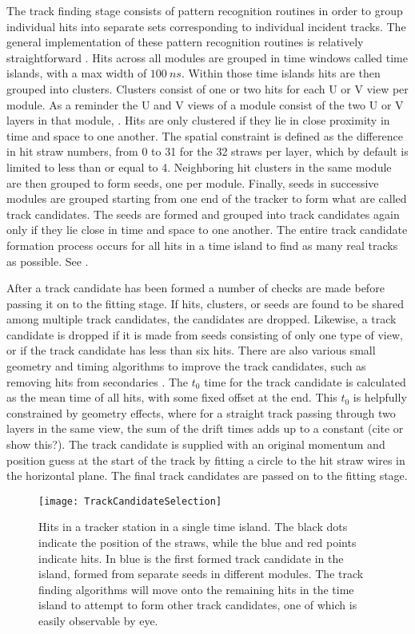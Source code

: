The track finding stage consists of pattern recognition routines in order to group individual hits into separate sets corresponding to individual incident tracks. The general implementation of these pattern recognition routines is relatively straightforward \cite{trackfinding,trackfinding2}. Hits across all modules are grouped in time windows called time islands, with a max width of $\SI{100}{ns}$. Within those time islands hits are then grouped into clusters. Clusters consist of one or two hits for each U or V view per module. As a reminder the U and V views of a module consist of the two U or V layers in that module, . Hits are only clustered if they lie in close proximity in time and space to one another. The spatial constraint is defined as the difference in hit straw numbers, from 0 to 31 for the 32 straws per layer, which by default is limited to less than or equal to 4. Neighboring hit clusters in the same module are then grouped to form seeds, one per module. Finally, seeds in successive modules are grouped starting from one end of the tracker to form what are called track candidates. The seeds are formed and grouped into track candidates again only if they lie close in time and space to one another. The entire track candidate formation process occurs for all hits in a time island to find as many real tracks as possible. See .

After a track candidate has been formed a number of checks are made before passing it on to the fitting stage. If hits, clusters, or seeds are found to be shared among multiple track candidates, the candidates are dropped. Likewise, a track candidate is dropped if it is made from seeds consisting of only one type of view, or if the track candidate has less than six hits. There are also various small geometry and timing algorithms to improve the track candidates, such as removing hits from secondaries \cite{trackfinding3}. The $t_{0}$ time for the track candidate is calculated as the mean time of all hits, with some fixed offset at the end. This $t_{0}$ is helpfully constrained by geometry effects, where for a straight track passing through two layers in the same view, the sum of the drift times adds up to a constant (cite or show this?). The track candidate is supplied with an original momentum and position guess at the start of the track by fitting a circle to the hit straw wires in the horizontal plane. The final track candidates are passed on to the fitting stage. 


\begin{figure}[]
    \centering
    \texttt{[image: TrackCandidateSelection]}
    \caption[Track candidate selection]{Hits in a tracker station in a single time island. The black dots indicate the position of the straws, while the blue and red points indicate hits. In blue is the first formed track candidate in the island, formed from separate seeds in different modules. The track finding algorithms will move onto the remaining hits in the time island to attempt to form other track candidates, one of which is easily observable by eye.}    
    \label{fig:TrackCandidateSelection}
\end{figure}

